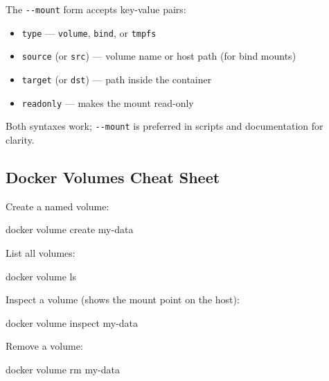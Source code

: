 \documentclass[11pt,american,a4paper,openany]{book}
\providecommand{\tightlist}{%
  \setlength{\itemsep}{2pt}\setlength{\parskip}{0pt}}
\newenvironment{Shaded}{}{}
\newcommand{\NormalTok}[1]{#1}
\begin{document}
The \texttt{-\/-mount} form accepts key-value pairs:

\begin{itemize}
\tightlist
\item
  \texttt{type} --- \texttt{volume}, \texttt{bind}, or \texttt{tmpfs}
\item
  \texttt{source} (or \texttt{src}) --- volume name or host path (for
  bind mounts)
\item
  \texttt{target} (or \texttt{dst}) --- path inside the container
\item
  \texttt{readonly} --- makes the mount read-only
\end{itemize}

Both syntaxes work; \texttt{-\/-mount} is preferred in scripts and
documentation for clarity.

\subsection{Docker Volumes Cheat
Sheet}\label{docker-volumes-cheat-sheet}

Create a named volume:

\begin{Shaded}
\begin{Highlighting}[]
\NormalTok{docker volume create my{-}data}
\end{Highlighting}
\end{Shaded}

List all volumes:

\begin{Shaded}
\begin{Highlighting}[]
\NormalTok{docker volume ls}
\end{Highlighting}
\end{Shaded}

Inspect a volume (shows the mount point on the host):

\begin{Shaded}
\begin{Highlighting}[]
\NormalTok{docker volume inspect my{-}data}
\end{Highlighting}
\end{Shaded}

Remove a volume:

\begin{Shaded}
\begin{Highlighting}[]
\NormalTok{docker volume rm my{-}data}
\end{Highlighting}
\end{Shaded}
\end{document}
